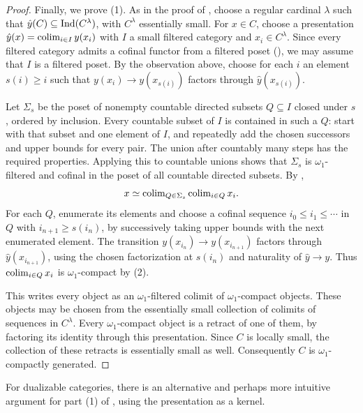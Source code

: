 \begin{proof}
		Finally, we prove (1). As in the proof of , choose a regular cardinal $\lambda$ such that $\hat{y}(C) \subseteq \operatorname{Ind}(C^{\lambda})$, with $C^{\lambda}$ essentially small. For $x \in C$, choose a presentation $\hat{y}(x) = \operatorname{colim}_{i\in I}y(x_i)$ with $I$ a small filtered category and $x_i \in C^{\lambda}$. Since every filtered category admits a cofinal functor from a filtered poset (), we may assume that $I$ is a filtered poset. By the observation above, choose for each $i$ an element $s(i) \geq i$ such that $y(x_i) \to y(x_{s(i)})$ factors through $\hat{y}(x_{s(i)})$.

		Let $\Sigma_s$ be the poset of nonempty countable directed subsets $Q \subseteq I$ closed under $s$, ordered by inclusion. Every countable subset of $I$ is contained in such a $Q$: start with that subset and one element of $I$, and repeatedly add the chosen successors and upper bounds for every pair. The union after countably many steps has the required properties. Applying this to countable unions shows that $\Sigma_s$ is $\omega_1$-filtered and cofinal in the poset of all countable directed subsets. By ,
		\[
			x \simeq \operatorname{colim}_{Q\in\Sigma_s}\operatorname{colim}_{i\in Q}x_i.
		\]
		For each $Q$, enumerate its elements and choose a cofinal sequence $i_0\leq i_1\leq\cdots$ in $Q$ with $i_{n+1}\geq s(i_n)$, by successively taking upper bounds with the next enumerated element. The transition $y(x_{i_n})\to y(x_{i_{n+1}})$ factors through $\hat{y}(x_{i_{n+1}})$, using the chosen factorization at $s(i_n)$ and naturality of $\hat{y}\to y$. Thus $\operatorname{colim}_{i\in Q}x_i$ is $\omega_1$-compact by (2).

		This writes every object as an $\omega_1$-filtered colimit of $\omega_1$-compact objects. These objects may be chosen from the essentially small collection of colimits of sequences in $C^{\lambda}$. Every $\omega_1$-compact object is a retract of one of them, by factoring its identity through this presentation. Since $C$ is locally small, the collection of these retracts is essentially small as well. Consequently $C$ is $\omega_1$-compactly generated.
	\end{proof}

	For dualizable categories, there is an alternative and perhaps more intuitive argument for part (1) of , using the presentation as a kernel.

